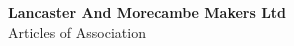 


\begin{titlepage}
\begin{center}
{\bf \LARGE Lancaster And Morecambe Makers Ltd}\\[36pt]
{\Large Articles of Association}

\vfill

\end{center}
\end{titlepage}


